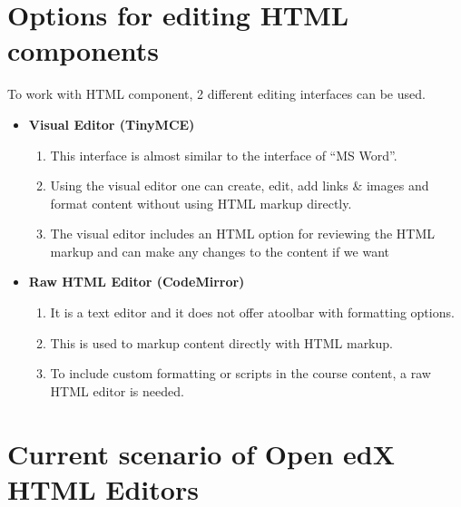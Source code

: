 \section{Options for editing HTML components}
To work with HTML component, 2 different editing interfaces can be used.
\begin{itemize}
	\item \textbf{Visual Editor (TinyMCE) }\newline
		\begin{enumerate}
			\item This interface is almost similar to the interface of “MS Word”.
			\item Using the visual editor one can create, edit, add links \& images and format content
without using HTML markup directly.
			\item The visual editor includes an HTML option for reviewing the HTML markup and can
make any changes to the content if we want
		\end{enumerate}
	\item \textbf{Raw HTML Editor (CodeMirror) }\newline
		\begin{enumerate}
			\item It is a text editor and it does not offer atoolbar with formatting options.
			\item This is used to markup content directly with HTML markup.
			\item To include custom formatting or scripts in the course content, a raw HTML editor
is needed.
		\end{enumerate}
\end{itemize}

\section{Current scenario of Open edX HTML Editors}

